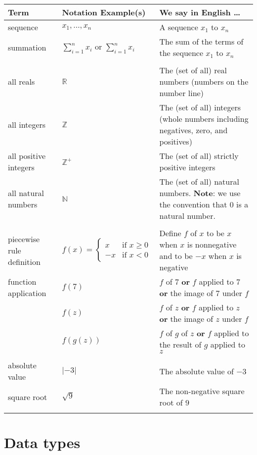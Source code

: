 \documentclass[12pt, oneside]{article}
\begin{document}
\begin{center}
\begin{tabular}{|llp{9.8cm}|}
\hline
{\bf Term} & {\bf Notation Example(s)} & {\bf We say in English \ldots } \\
\hline
sequence & $x_1, \ldots, x_n$ & A sequence $x_1$ to $x_n$ \\
summation & $\sum_{i=1}^n x_i$ or $\displaystyle{\sum_{i=1}^n x_i}$ & The sum of the terms of the sequence $x_1$ to $x_n$ \\
&&\\
all reals & $\mathbb{R}$ & The (set of all) real numbers (numbers on the number line)\\
all integers & $\mathbb{Z}$ & The (set of all) integers (whole numbers including negatives, zero, and positives) \\
all positive integers & $\mathbb{Z}^+$ & The (set of all) strictly positive integers \\
all natural numbers & $\mathbb{N}$ & The (set of all) natural numbers. {\bf Note}: we use the convention that $0$ is a natural number. \\
&&\\
piecewise rule definition & $f(x) = \begin{cases} x & \text{if~}x \geq 0 \\ -x & \text{if~}x<0\end{cases}$ &
Define $f$ of $x$ to be $x$ when $x$ is nonnegative and to be $-x$ when $x$ is negative\\
function application & $f(7)$ & $f$ of $7$ {\bf or} $f$ applied to $7$ {\bf or} the image of $7$ under $f$\\
                     & $f(z)$ & $f$ of $z$ {\bf or} $f$ applied to $z$ {\bf or} the image of $z$ under $f$\\
                     & $f(g(z))$ & $f$ of $g$ of $z$ {\bf or} $f$ applied to the result of $g$ applied to $z$ \\
&&\\
absolute value & $\lvert -3 \rvert$ & The absolute value of $-3$ \\
square root & $\sqrt{9}$ & The non-negative square root of $9$ \\
&&\\


\hline
\end{tabular}
\end{center} \vfill
\section*{Data types}
\end{document}
